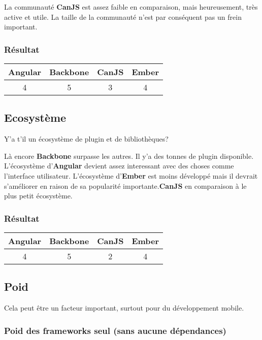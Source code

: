 La communauté \textbf{CanJS} est assez faible en comparaison, mais heureusement, très active et utile. La taille de la communauté n’est par conséquent pas un frein important.

\subsubsection{Résultat}
\begin{tabular}{|c|c|c|c|}
  \hline 
  Angular & Backbone & CanJS & Ember \\
  \hline 
  4 & 5 & 3 & 4 \\
  \hline
\end{tabular}

\subsection{Ecosystème}

Y’a t’il un écosystème de plugin et de bibliothèques?

Là encore \textbf{Backbone} surpasse les autres. Il y’a des tonnes de plugin disponible. L’écosystème d’\textbf{Angular} devient assez interessant avec des choses comme l’interface utilisateur. L’écosystème d’\textbf{Ember} est moins développé mais il devrait s’améliorer en raison de sa popularité importante.\textbf{CanJS} en comparaison à le plus petit écosystème.



\subsubsection{Résultat}
\begin{tabular}{|c|c|c|c|}
  \hline 
  Angular & Backbone & CanJS & Ember \\
  \hline 
  4 & 5 & 2 & 4 \\
  \hline
\end{tabular}

\subsection{Poid}

Cela peut être un facteur important, surtout pour du développement mobile.

\subsubsection{Poid des frameworks seul (sans aucune dépendances)}


